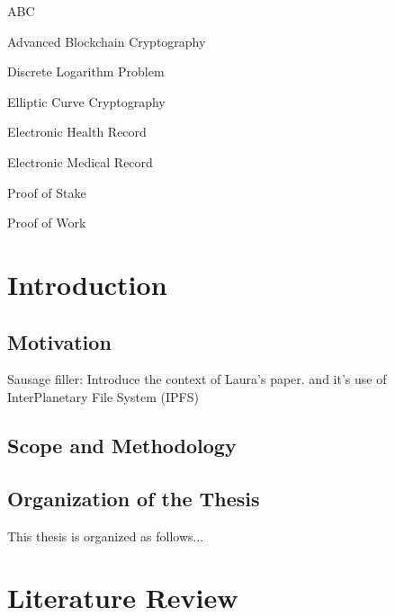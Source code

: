 \documentclass[cic,tc,english]{iiufrgs}
\begin{document}
\listoffigures

\listoftables

\begin{listofabbrv}{ABC} %
    \item[ABC] Advanced Blockchain Cryptography
    \item[DLP] Discrete Logarithm Problem
    \item[ECC] Elliptic Curve Cryptography
    \item[EHR] Electronic Health Record
    \item[EMR] Electronic Medical Record
    \item[PoS] Proof of Stake
    \item[PoW] Proof of Work
\end{listofabbrv}


\tableofcontents

\chapter{Introduction}

\section{Motivation}
Sausage filler: Introduce the context of Laura's paper. \cite{laura2023} and it's use of InterPlanetary File System (IPFS) \cite{benet2013ipfs}

\section{Scope and Methodology}


\section{Organization of the Thesis}
This thesis is organized as follows...


\chapter{Literature Review}
\end{document}
